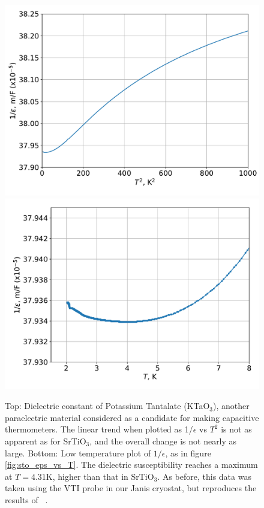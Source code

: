 \documentclass{thesis-umich}
\begin{document}
\begin{figure} \caption[Dielectric Constant of Potassium Tantalate]{Top: Dielectric constant of Potassium Tantalate
		(KTaO$_3$), another paraelectric material considered as a
		candidate for making capacitive thermometers. The linear trend
		when plotted as 1/$\epsilon$ vs $T^2$ is not as apparent as for
		SrTiO$_3$, and the overall change is not nearly as large.
		Bottom: Low temperature plot of $1/\epsilon$, as in figure
		\ref{fig:sto_eps_vs_T}. The dielectric susceptibility reaches a
		maximum at $T = 4.31$K, higher than that in SrTiO$_3$. As
		before, this data was taken using the VTI probe in our Janis
		cryostat, but reproduces the results of ~\cite{Rowley2014}.}
		\label{fig:kto_eps_vs_T}
	\centering
	\includegraphics[width=0.8\columnwidth]{figures/KTO_eps_vs_T.pdf}
	\includegraphics[width=0.8\columnwidth]{figures/KTO_eps_vs_T_low.pdf}
\end{figure}
\end{document}
